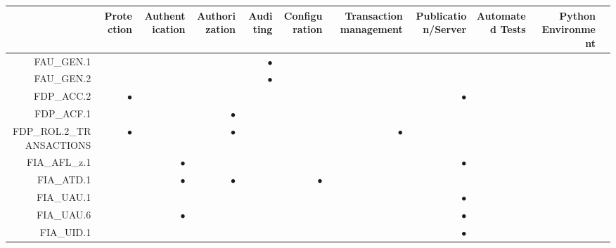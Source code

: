 \documentclass[12pt,english]{scrbook}
\newcommand{\oh}{$\bullet$}
\begin{document}
\begin{longtable}{r|R|R|R|R|R|R|R|R|R|R}
        \toprule
                    & Protection & Authentication & Authorization & Auditing & Configuration & Transaction management & Publication/Server & Automated Tests & Python Environment \\
        \midrule\endhead
FAU\_GEN.1          &            &                &               & \oh      &               &                        &                    &                 &                    \\   
FAU\_GEN.2          &            &                &               & \oh      &               &                        &                    &                 &                    \\   
FDP\_ACC.2          & \oh        &                &               &          &               &                        & \oh                &                 &                    \\   
FDP\_ACF.1          &            &                &  \oh          &          &               &                        &                    &                 &                    \\   
FDP\_ROL.2\_TRANSACTIONS
                    & \oh        &                &  \oh          &          &               & \oh                    &                    &                 &                    \\   
FIA\_AFL\_z.1       &            &  \oh           &               &          &               &                        & \oh                &                 &                    \\   
FIA\_ATD.1          &            & \oh            &  \oh          &          & \oh           &                        &                    &                 &                    \\   
FIA\_UAU.1          &            &                &               &          &               &                        & \oh                &                 &                    \\   
FIA\_UAU.6          &            &  \oh           &               &          &               &                        & \oh                &                 &                    \\   
FIA\_UID.1          &            &                &               &          &               &                        & \oh                &                 &                    \\   

\end{longtable}
\end{document}
